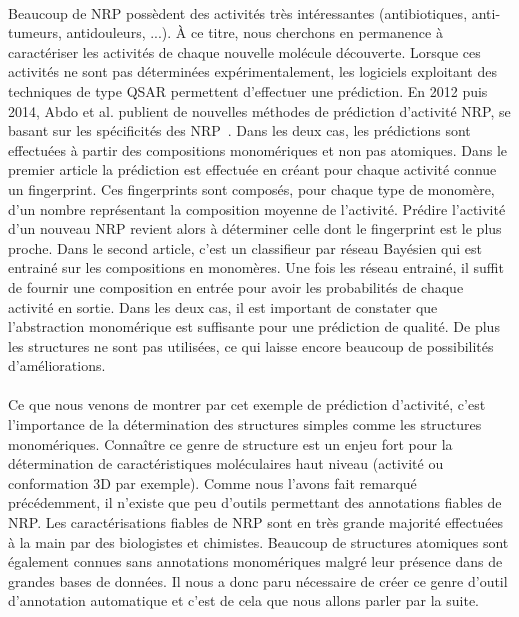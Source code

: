 \documentclass[12pt,french,twoside]{report}
\begin{document}
\paragraph{}Beaucoup de NRP possèdent des activités très intéressantes (antibiotiques, anti-tumeurs, antidouleurs, ...).
À ce titre, nous cherchons en permanence à caractériser les activités de chaque nouvelle molécule découverte.
Lorsque ces activités ne sont pas déterminées expérimentalement, les logiciels exploitant des techniques de type QSAR permettent d'effectuer une prédiction.
En 2012 puis 2014, Abdo et al. publient de nouvelles méthodes de prédiction d'activité NRP, se basant sur les spécificités des NRP~\cite{abdo_new_2012, abdo_prediction_2014}.
Dans les deux cas, les prédictions sont effectuées à partir des compositions monomériques et non pas atomiques.
Dans le premier article la prédiction est effectuée en créant pour chaque activité connue un fingerprint.
Ces fingerprints sont composés, pour chaque type de monomère, d'un nombre représentant la composition moyenne de l'activité. 
Prédire l'activité d'un nouveau NRP revient alors à déterminer celle dont le fingerprint est le plus proche.
Dans le second article, c'est un classifieur par réseau Bayésien qui est entrainé sur les compositions en monomères.
Une fois les réseau entrainé, il suffit de fournir une composition en entrée pour avoir les probabilités de chaque activité en sortie.
Dans les deux cas, il est important de constater que l'abstraction monomérique est suffisante pour une prédiction de qualité.
De plus les structures ne sont pas utilisées, ce qui laisse encore beaucoup de possibilités d'améliorations.

\paragraph{}Ce que nous venons de montrer par cet exemple de prédiction d'activité, c'est l'importance de la détermination des structures simples comme les structures monomériques.
Connaître ce genre de structure est un enjeu fort pour la détermination de caractéristiques moléculaires haut niveau (activité ou conformation 3D par exemple).
Comme nous l'avons fait remarqué précédemment, il n'existe que peu d'outils permettant des annotations fiables de NRP.
Les caractérisations fiables de NRP sont en très grande majorité effectuées à la main par des biologistes et chimistes.
Beaucoup de structures atomiques sont également connues sans annotations monomériques malgré leur présence dans de grandes bases de données.
Il nous a donc paru nécessaire de créer ce genre d'outil d'annotation automatique et c'est de cela que nous allons parler par la suite.
\end{document}
